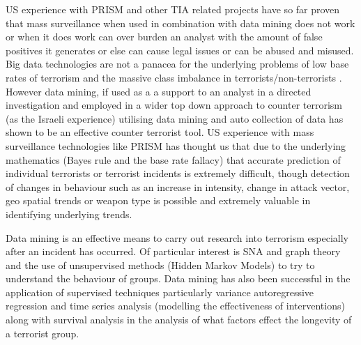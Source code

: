 US experience with PRISM and other TIA related projects have so far proven that mass surveillance when used in combination with data mining does not work or when it does work  can over burden an analyst with the amount of false positives it generates or else can cause legal issues or can be abused and misused. 
Big data technologies are not a panacea for the underlying problems of low base rates of terrorism and the massive class imbalance in terrorists/non-terrorists \citep{Masssurvelilancefail2015}. However data mining, if used as a a support to an analyst in a directed investigation and employed in a wider top down approach to counter terrorism (as the Israeli experience) utilising data mining and auto collection of data has shown to be an effective counter terrorist tool. US experience with mass surveillance technologies like PRISM has thought us that due to the underlying mathematics (Bayes rule and the base rate fallacy) \citep{schneier2015data} that accurate prediction of individual terrorists or terrorist incidents is extremely difficult, though detection of changes in behaviour such as an increase in intensity, change in attack vector, geo spatial trends or weapon type is possible and extremely valuable in identifying underlying trends. 

Data mining is an effective means to carry out research into terrorism especially after an incident has occurred. Of particular interest is SNA and graph theory and the use of unsupervised methods (Hidden Markov Models) to try to understand the behaviour of groups. Data mining has also been successful in the application of supervised techniques particularly variance autoregressive regression and time series analysis (modelling the effectiveness of interventions) along with survival analysis in the analysis of what factors effect the longevity of a terrorist group.  
